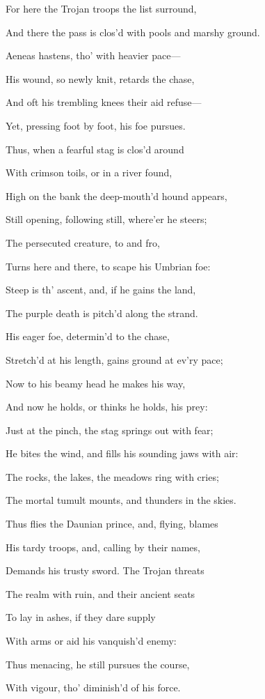 For here the Trojan troops the list surround,

And there the pass is clos’d with pools and marshy ground.

Aeneas hastens, tho’ with heavier pace—

His wound, so newly knit, retards the chase,

And oft his trembling knees their aid refuse—

Yet, pressing foot by foot, his foe pursues.

Thus, when a fearful stag is clos’d around

With crimson toils, or in a river found,

High on the bank the deep-mouth’d hound appears,

Still opening, following still, where’er he steers;

The persecuted creature, to and fro,

Turns here and there, to scape his Umbrian foe:

Steep is th’ ascent, and, if he gains the land,

The purple death is pitch’d along the strand.

His eager foe, determin’d to the chase,

Stretch’d at his length, gains ground at ev’ry pace;

Now to his beamy head he makes his way,

And now he holds, or thinks he holds, his prey:

Just at the pinch, the stag springs out with fear;

He bites the wind, and fills his sounding jaws with air:

The rocks, the lakes, the meadows ring with cries;

The mortal tumult mounts, and thunders in the skies.

Thus flies the Daunian prince, and, flying, blames

His tardy troops, and, calling by their names,

Demands his trusty sword. The Trojan threats

The realm with ruin, and their ancient seats

To lay in ashes, if they dare supply

With arms or aid his vanquish’d enemy:

Thus menacing, he still pursues the course,

With vigour, tho’ diminish’d of his force.

